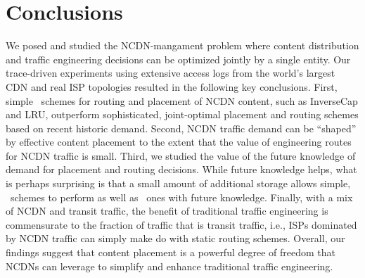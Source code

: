 \section{Conclusions}
\label{sec:concl-ncdn}


We posed and studied the NCDN-mangament problem where content distribution and traffic engineering decisions can be optimized jointly by a single entity. %
Our trace-driven experiments using extensive access logs from the world's largest CDN and real ISP topologies resulted in the following key conclusions. First, simple \unplanned\ schemes for routing and placement of NCDN content, such as InverseCap and LRU, outperform sophisticated, joint-optimal placement and routing schemes based on recent historic demand. Second,  NCDN traffic demand can be ``shaped'' by effective content placement to the extent that the value of engineering routes for NCDN traffic is small.  Third, we studied the value of the future knowledge of demand for placement and routing decisions. While future knowledge helps, what is perhaps surprising is that a small amount of additional storage allows simple, \unplanned\ schemes to perform as well as \planned\ ones with future knowledge. Finally, with a mix of NCDN and transit traffic, the benefit of traditional traffic engineering is commensurate to the fraction of traffic that is transit traffic, i.e., ISPs dominated by NCDN traffic can simply make do with static routing schemes.  Overall, our findings suggest that content placement is a powerful degree of freedom that NCDNs can leverage to simplify and enhance traditional traffic engineering.




